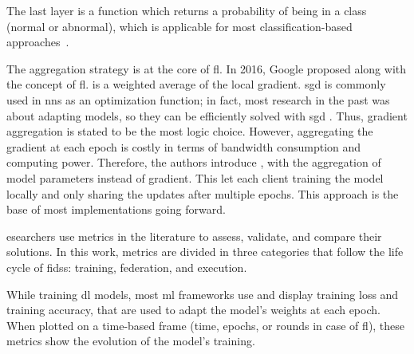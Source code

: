 The last layer is a  function which returns a probability of being in a class (normal or abnormal), which is applicable for most classification-based approaches~\cite{fan_IoTDefenderFederatedTransfer_2020,li_DeepFedFederatedDeep_2020,Popoola2021,rahman_InternetThingsIntrusion_2020,Sun2020,Sun2021,al-athbaal-marri_FederatedMimicLearning_2020}.



The aggregation strategy is at the core of \gls{fl}.
In 2016, Google proposed  \cite{McMahan2017} along with the concept of \gls{fl}.
 is a weighted average of the local gradient.
\Gls{sgd} is commonly used in \glspl{nn} as an optimization function; in fact, most research in the past was about adapting models, so they can be efficiently solved with \gls{sgd} \cite{McMahan2017,Goodfellow2016}.
Thus, gradient aggregation is stated to be the most logic choice.
However, aggregating the gradient at each epoch is costly in terms of bandwidth consumption and computing power.
Therefore, the authors introduce , with the aggregation of model parameters instead of gradient.
This let each client training the model locally and only sharing the updates after multiple epochs.
This approach is the base of most implementations going forward.


esearchers use metrics in the literature to assess, validate, and compare their solutions.
In this work, metrics are divided in three categories that follow the life cycle of \glspl{fids}: training, federation, and execution.

While training \gls{dl} models, most \gls{ml} frameworks use and display training loss and training accuracy, that are used to adapt the model's weights at each epoch.
When plotted on a time-based frame (time, epochs, or rounds in case of \gls{fl}), these metrics show the evolution of the model's training.